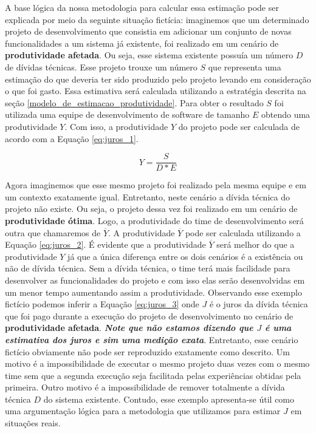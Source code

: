 A base lógica da nossa metodologia para calcular essa estimação pode ser explicada por meio da seguinte situação fictícia: imaginemos que um determinado projeto de desenvolvimento que consistia em adicionar um conjunto de novas funcionalidades a um sistema já existente, foi realizado em um cenário de  \textbf{produtividade afetada}. Ou seja, esse sistema existente possuía um número  $D$ de dívidas técnicas.  Esse projeto trouxe um número $S$ que representa uma estimação do que deveria ter sido produzido pelo projeto levando em consideração o que foi gasto. Essa estimativa será calculada utilizando a estratégia descrita na seção \ref{modelo_de_estimacao_produtividade}. Para obter o resultado  $S$  foi utilizada  uma equipe de desenvolvimento de software de tamanho $E$ obtendo uma produtividade $Y$.   Com isso, a produtividade $Y$ do projeto pode ser calculada de acordo com a Equação \ref{eq:juros_1}.

\begin{equation}
\label{eq:juros_1}
Y =  \frac{S}{D*E}
\end{equation}


Agora imaginemos que esse mesmo projeto foi realizado pela mesma equipe e em um contexto exatamente igual. Entretanto, neste cenário a dívida técnica do projeto não existe. Ou seja, o projeto dessa vez foi realizado em um cenário de \textbf{produtividade ótima}. Logo, a produtividade do time de desenvolvimento será outra que chamaremos de $\overline{Y}$. A produtividade  $\overline{Y}$ pode ser calculada utilizando a Equação \ref{eq:juros_2}. É evidente que  a produtividade $\overline{Y}$ será melhor do que a produtividade  $Y$ já que a única diferença entre os dois cenários é a existência ou não de dívida técnica. Sem a dívida técnica, o time terá mais facilidade para desenvolver as funcionalidades do projeto e com isso elas serão desenvolvidas em um menor tempo aumentando assim a produtividade. Observando esse exemplo fictício podemos inferir a Equação \ref{eq:juros_3} onde $J$ é o juros da dívida técnica que foi pago durante a execução do projeto de desenvolvimento no cenário de \textbf{produtividade afetada}. \textit{\textbf{Note que não estamos dizendo que  $J$  é uma estimativa dos juros e sim uma medição exata}}. Entretanto, esse cenário fictício obviamente não pode ser reproduzido exatamente como descrito. Um motivo é a impossibilidade de executar o mesmo projeto duas vezes com o mesmo time sem que a segunda execução seja facilitada pelas experiências obtidas pela primeira. Outro motivo é a impossibilidade de remover totalmente a dívida técnica $D$ do sistema existente. Contudo, esse exemplo apresenta-se útil como uma argumentação lógica para a metodologia que utilizamos para estimar $J$ em situações reais.

